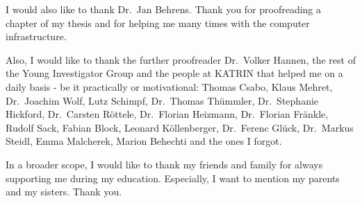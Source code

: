 I would also like to thank Dr.~Jan Behrens. Thank you for proofreading a chapter of my thesis and for helping me many times with the computer infrastructure.


Also, I would like to thank the further proofreader Dr.~Volker Hannen, the rest of the Young Investigator Group and the people at KATRIN that helped me on a daily basis - be it practically or motivational: Thomas Csabo, Klaus Mehret, Dr.~Joachim Wolf, Lutz Schimpf, Dr.~Thomas Thümmler, Dr.~Stephanie Hickford, Dr.~Carsten Röttele, Dr.~Florian Heizmann, Dr.~Florian Fränkle, Rudolf Sack, Fabian Block, Leonard Köllenberger, Dr.~Ferenc Glück, Dr.~Markus Steidl, Emma Malcherek, Marion Behechti and the ones I forgot. 


In a broader scope, I would like to thank my friends and family for always supporting me during my education. Especially, I want to mention my parents and my sisters. Thank you.